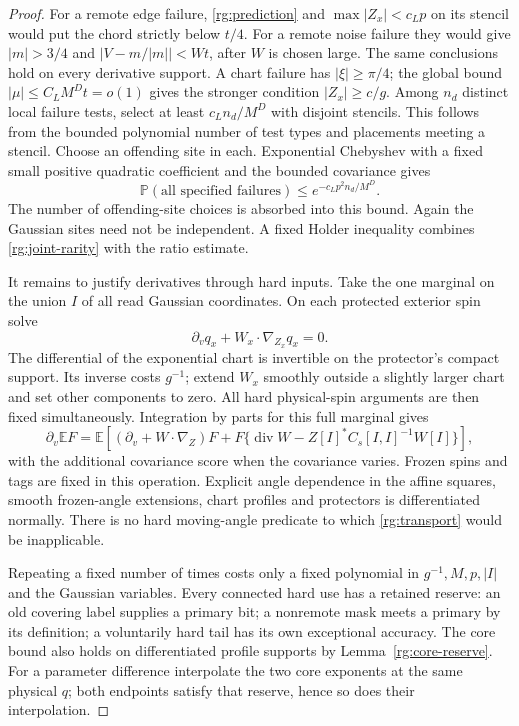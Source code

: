 \begin{proof}
For a remote edge failure, \eqref{rg:prediction} and
$\max|Z_x|<c_Lp$ on its stencil would put the chord strictly below
$t/4$.  For a remote noise failure they would give $|m|>3/4$ and
$|V-m/|m||<Wt$, after $W$ is chosen large.  The same conclusions
hold on every derivative support.  A chart failure has
$|\xi|\ge\pi/4$; the global bound $|\mu|\le C_LM^Dt=o(1)$ gives
the stronger condition $|Z_x|\ge c/g$.
Among $n_d$ distinct local failure tests, select at least
$c_Ln_d/M^D$ with disjoint stencils.  This follows from the bounded
polynomial number of test types and placements meeting a stencil.
Choose an offending site in each.  Exponential Chebyshev with a
fixed small positive quadratic coefficient and the bounded
covariance gives
\begin{equation}
 \mathbb P(\text{all specified failures})
             \le e^{-c_Lp^2n_d/M^D}.
 \label{rg:joint-rarity}
\end{equation}
The number of offending-site choices is absorbed into this bound.
Again the Gaussian sites need not be independent.  A fixed Holder
inequality combines \eqref{rg:joint-rarity} with the ratio estimate.

It remains to justify derivatives through hard inputs.  Take the
one marginal on the union $I$ of all read Gaussian coordinates.
On each protected exterior spin solve
\[
 \partial_vq_x+W_x\cdot\nabla_{Z_x}q_x=0.
\]
The differential of the exponential chart is invertible on the
protector's compact support.  Its inverse costs $g^{-1}$; extend
$W_x$ smoothly outside a slightly larger chart and set other
components to zero.  All hard physical-spin arguments are then
fixed simultaneously.  Integration by parts for this full marginal
gives
\begin{equation}
 \partial_v\mathbb E F=\mathbb E\left[
  (\partial_v+W\cdot\nabla_Z)F+
  F\{\operatorname{div}W-Z[I]^*C_s[I,I]^{-1}W[I]\}\right],
 \label{rg:transport}
\end{equation}
with the additional covariance score when the covariance varies.
Frozen spins and tags are fixed in this operation.  Explicit angle
dependence in the affine squares, smooth frozen-angle extensions,
chart profiles and protectors is differentiated normally.  There
is no hard moving-angle predicate to which
\eqref{rg:transport} would be inapplicable.

Repeating a fixed number of times costs only a fixed polynomial in
$g^{-1},M,p,|I|$ and the Gaussian variables.  Every connected hard
use has a retained reserve: an old covering label supplies a
primary bit; a nonremote mask meets a primary by its definition;
a voluntarily hard tail has its own exceptional accuracy.
The core bound also holds on differentiated profile supports by
Lemma~\ref{rg:core-reserve}.  For a parameter difference interpolate
the two core exponents at the same physical $q$; both endpoints
satisfy that reserve, hence so does their interpolation.


\end{proof}
